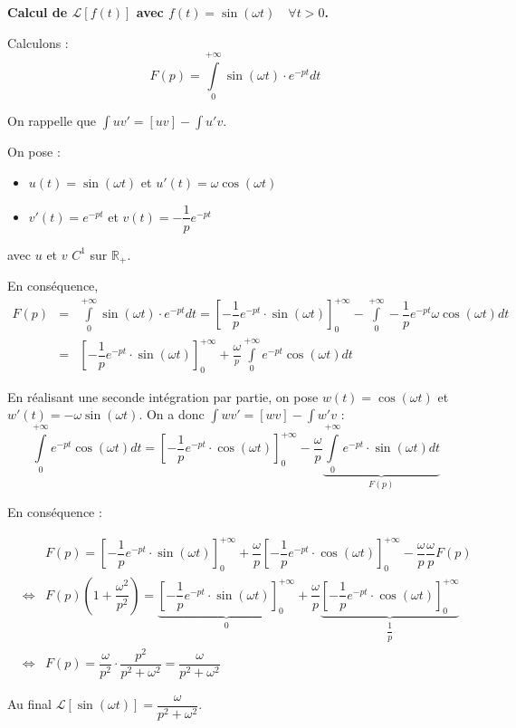 \documentclass[11pt,oneside]{article}
\begin{document}
\begin{demo}
\textbf{Calcul de $\mathcal{L}\left[f(t) \right]$ avec $f(t)= \sin \left(\omega t \right)\quad \forall t> 0$.}

Calculons :
$$
F(p)= \int\limits_0^{+ \infty} \sin \left(\omega t \right) \cdot e^{-pt}dt
$$

On rappelle que $\int uv'  = [uv]-\int u'v$.

On pose : 
\begin{itemize}
\item $u(t)=\sin \left(\omega t\right)$ et $u'(t)=\omega \cos \left(\omega t\right)$
\item $v'(t)=e^{-pt}$ et $v(t)=-\dfrac{1}{p}e^{-pt}$
\end{itemize}
avec $u$ et $v$ $C^1$ sur $\mathbb{R_+}$.

En conséquence, 
\begin{eqnarray*}
F(p)
&=& \int\limits_0^{+ \infty} \sin \left(\omega t \right) \cdot e^{-pt}dt
= \left[-\dfrac{1}{p}e^{-pt} \cdot \sin \left(\omega t\right) \right]_0^{+ \infty}
- \int\limits_0^{+ \infty} -\dfrac{1}{p}e^{-pt} \omega \cos \left(\omega t\right) dt \\
&=& \left[-\dfrac{1}{p}e^{-pt} \cdot \sin \left(\omega t\right) \right]_0^{+ \infty}
+\dfrac{\omega}{^p}\int\limits_0^{+ \infty} e^{-pt} \cos \left(\omega t\right) dt
\end{eqnarray*}

En réalisant une seconde intégration par partie, on pose $w(t)=\cos \left(\omega t\right)$ et $w'(t)=-\omega \sin \left(\omega t\right)$. On a donc $\int wv'  = [wv]-\int w'v$ :
$$
\int\limits_0^{+ \infty} e^{-pt} \cos \left(\omega t\right) dt
= \left[-\dfrac{1}{p}e^{-pt} \cdot \cos \left(\omega t\right) \right]_0^{+ \infty}
- \dfrac{\omega}{p} \underbrace{\int\limits_0^{+ \infty} e^{-pt} \cdot  \sin \left(\omega t\right) dt}_{F(p)}
$$

En conséquence :

\begin{eqnarray*}
&&F(p)=\left[-\dfrac{1}{p}e^{-pt} \cdot \sin \left(\omega t\right) \right]_0^{+ \infty}
+\dfrac{\omega}{p}\left[-\dfrac{1}{p}e^{-pt} \cdot \cos \left(\omega t\right) \right]_0^{+ \infty}
- \dfrac{\omega}{p}\dfrac{\omega}{p} F(p) \\
&\Longleftrightarrow &
F(p)\left(1+\dfrac{\omega^2}{p^2}\right) =\underbrace{\left[-\dfrac{1}{p}e^{-pt} \cdot \sin \left(\omega t\right) \right]_0^{+ \infty}}_{0}
+\dfrac{\omega}{p}
\underbrace{\left[-\dfrac{1}{p}e^{-pt} \cdot \cos \left(\omega t\right) \right]_0^{+ \infty}}_{\dfrac{1}{p}}\\
&\Longleftrightarrow &
F(p)=\dfrac{\omega}{p^2}\cdot\dfrac{p^2}{p^2+\omega^2} = \dfrac{\omega}{p^2+\omega^2}
\end{eqnarray*}

Au final $\mathcal{L}\left[\sin(\omega t) \right] = \dfrac{\omega}{p^2+\omega^2}$.

\end{demo}
\end{document}
